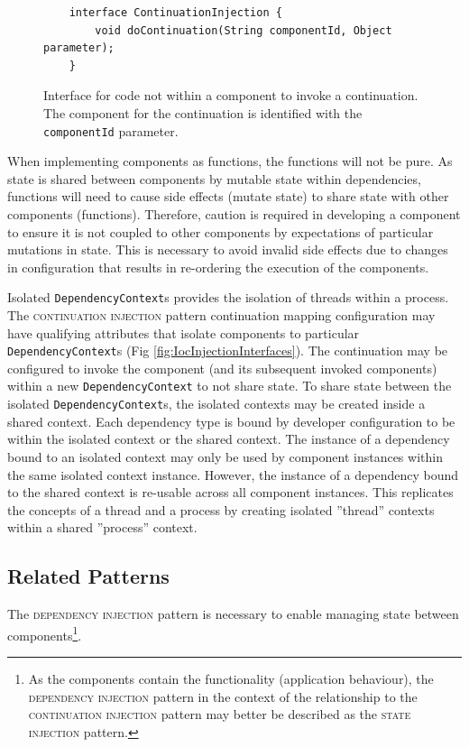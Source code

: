 \documentclass[prodmode]{style/acmlarge}
\begin{document}
\begin{figure}[tp]
\begin{verbatim}
    interface ContinuationInjection {
        void doContinuation(String componentId, Object parameter);
    }
\end{verbatim}
\caption{Interface for code not within a component to invoke a continuation.  The component for the continuation is identified with the \texttt{componentId} parameter.}
\label{fig:ContinuationInjectionInterface}
\end{figure}

When implementing components as functions, the functions will not be pure.  As
state is shared between components by mutable state within dependencies,
functions will need to cause side effects (mutate state) to share state with
other components (functions).  Therefore, caution is required in developing a
component to ensure it is not coupled to other components by expectations of
particular mutations in state.  This is necessary to avoid invalid side effects
due to changes in configuration that results in re-ordering the execution of the
components.

Isolated \texttt{DependencyContext}s provides the isolation of threads within a
process.  The \textsc{continuation injection} pattern continuation mapping
configuration may have qualifying attributes that isolate components to
particular \texttt{DependencyContext}s (Fig \ref{fig:IocInjectionInterfaces}).
The continuation may be configured to invoke the component (and its subsequent
invoked components) within a new \texttt{DependencyContext} to not share state. 
To share state between the isolated \texttt{Depend\-ency\-Context}s, the
isolated contexts may be created inside a shared context.  Each dependency type
is bound by developer configuration to be within the isolated context or the
shared context.  The instance of a dependency bound to an isolated context may
only be used by component instances within the same isolated context instance. 
However, the instance of a dependency bound to the shared context is re-usable
across all component instances.  This replicates the concepts of a thread and a
process by creating isolated ''thread'' contexts within a shared ''process''
context.


\subsection{Related Patterns}

The \textsc{dependency injection} pattern \cite{ioc} is necessary to enable
managing state between components\footnote{As the components contain the
functionality (application behaviour), the \textsc{dependency injection} pattern
in the context of the relationship to the \textsc{continuation injection}
pattern may better be described as the \textsc{state injection} pattern.}.
\end{document}
